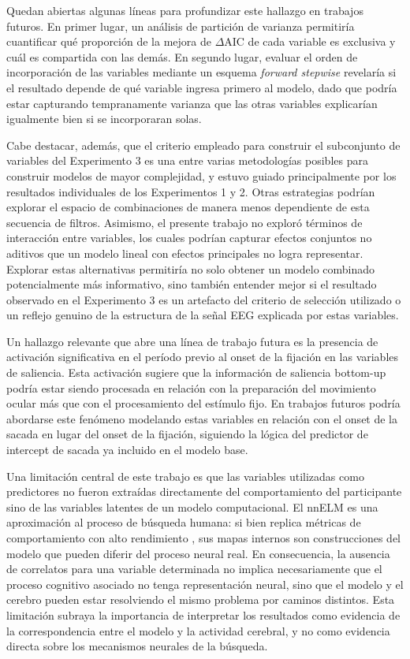Quedan abiertas algunas líneas para profundizar este hallazgo en trabajos futuros. En primer lugar, un análisis de partición de varianza permitiría cuantificar qué proporción de la mejora de $\Delta$AIC de cada variable es exclusiva y cuál es compartida con las demás. En segundo lugar, evaluar el orden de incorporación de las variables mediante un esquema \textit{forward stepwise} revelaría si el resultado depende de qué variable ingresa primero al modelo, dado que  podría estar capturando tempranamente varianza que las otras variables explicarían igualmente bien si se incorporaran solas. 

Cabe destacar, además, que el criterio empleado para construir el subconjunto de variables del Experimento 3 es una entre varias metodologías posibles para construir modelos de mayor complejidad, y estuvo guiado principalmente por los resultados individuales de los Experimentos 1 y 2. Otras estrategias podrían explorar el espacio de combinaciones de manera menos dependiente de esta secuencia de filtros. Asimismo, el presente trabajo no exploró términos de interacción entre variables, los cuales podrían capturar efectos conjuntos no aditivos que un modelo lineal con efectos principales no logra representar. Explorar estas alternativas permitiría no solo obtener un modelo combinado potencialmente más informativo, sino también entender mejor si el resultado observado en el Experimento 3 es un artefacto del criterio de selección utilizado o un reflejo genuino de la estructura de la señal EEG explicada por estas variables.

Un hallazgo relevante que abre una línea de trabajo futura es la presencia de activación significativa en el período previo al onset de la fijación en las variables de saliencia. Esta activación  sugiere que la información de saliencia bottom-up podría estar siendo procesada en relación con la preparación del movimiento ocular más que con el procesamiento del estímulo fijo. En trabajos futuros podría abordarse este fenómeno modelando estas variables en relación con el onset de la sacada en lugar del onset de la fijación, siguiendo la lógica del predictor de intercept de sacada ya incluido en el modelo base.

Una limitación central de este trabajo es que las variables utilizadas como predictores no fueron extraídas directamente del comportamiento del participante sino de las variables latentes de un modelo computacional. El nnELM es una aproximación al proceso de búsqueda humana: si bien replica métricas de comportamiento con alto rendimiento \citep{ruarte2025}, sus mapas internos son construcciones del modelo que pueden diferir del proceso neural real. En consecuencia, la ausencia de correlatos para una variable determinada no implica necesariamente que el proceso cognitivo asociado no tenga representación neural, sino que el modelo y el cerebro pueden estar resolviendo el mismo problema por caminos distintos. Esta limitación subraya la importancia de interpretar los resultados como evidencia de la correspondencia entre el modelo y la actividad cerebral, y no como evidencia directa sobre los mecanismos neurales de la búsqueda.

